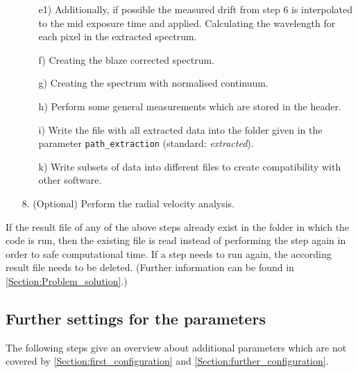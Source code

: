\documentclass[10pt,a4paper]{article}
\begin{document}
\begin{itemize}
\begin{itemize}
    \item[e1)] Additionally, if possible the measured drift from step 6 is interpolated to the mid exposure time and applied. Calculating the wavelength for each pixel in the extracted spectrum.
    \item[f)] Creating the blaze corrected spectrum.
    \item[g)] Creating the spectrum with normalised continuum.
    \item[h)] Perform some general measurements which are stored in the header.
    \item[i)] Write the file with all extracted data into the folder given in the parameter \verb|path_extraction| (standard: \textit{extracted}).
    \item[k)] Write subsets of data into different files to create compatibility with other software.
  \end{itemize}
  \item[8.] (Optional) Perform the radial velocity analysis.
\end{itemize}

\noindent If the result file of any of the above steps already exist in the folder in which the code is run, then the existing file is read instead of performing the step again in order to safe computational time. If a step needs to run again, the according result file needs to be deleted. (Further information can be found in \ref{Section:Problem_solution}.)


\subsection{Further settings for the parameters}
\label{Section:further_parameters}
The following steps give an overview about additional parameters which are not covered by \ref{Section:first_configuration} and \ref{Section:further_configuration}.
\end{document}
